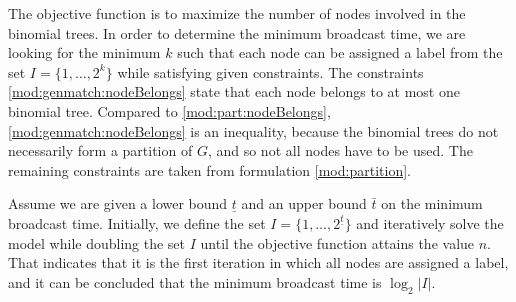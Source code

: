 The objective function is to maximize the number of nodes involved in the binomial trees.
In order to determine the minimum broadcast time, we are looking for the minimum $k$ such that each node can be assigned a label from the set $I=\{1,\dots,2^k\}$ while satisfying given constraints.
The constraints \eqref{mod:genmatch:nodeBelongs} state that each node belongs to at most one binomial tree.
Compared to \eqref{mod:part:nodeBelongs}, \eqref{mod:genmatch:nodeBelongs} is an inequality, because the binomial trees do not necessarily form a partition of $G$, and so not all nodes have to be used.
The remaining constraints are taken from formulation \eqref{mod:partition}.

Assume we are given a lower bound $\underline{t}$ and an upper bound $\bar{t}$ on the minimum broadcast time.
Initially, we define the set $I=\{1,\dots,2^{\underline{t}}\}$ and iteratively solve the model while doubling the set $I$ until the objective function attains the value $n$.
That indicates that it is the first iteration in which all nodes are assigned a label, and it can be concluded that the minimum broadcast time is $\log_2|I|$.





